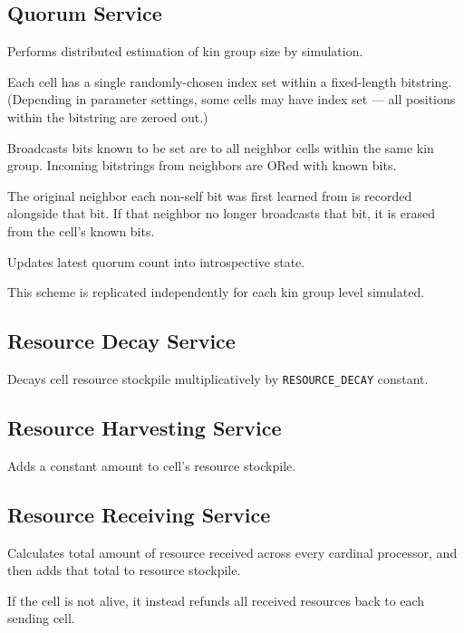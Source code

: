 \subsection{Quorum Service}


Performs distributed estimation of kin group size by simulation.

Each cell has a single randomly-chosen index set within a fixed-length bitstring.
(Depending in parameter settings, some cells may have index set --- all positions within the bitstring are zeroed out.)

Broadcasts bits known to be set are to all neighbor cells within the same kin group.
Incoming bitstrings from neighbors are ORed with known bits.

The original neighbor each non-self bit was first learned from is recorded alongside that bit.
If that neighbor no longer broadcasts that bit, it is erased from the cell's known bits.

Updates latest quorum count into introspective state.

This scheme is replicated independently for each kin group level simulated.

\subsection{Resource Decay Service}


Decays cell resource stockpile multiplicatively by \texttt{RESOURCE\_DECAY} constant.

\subsection{Resource Harvesting Service}


Adds a constant amount to cell's resource stockpile.

\subsection{Resource Receiving Service}


Calculates total amount of resource received across every cardinal processor, and then adds that total to resource stockpile.

If the cell is not alive, it instead refunds all received resources back to each sending cell.

